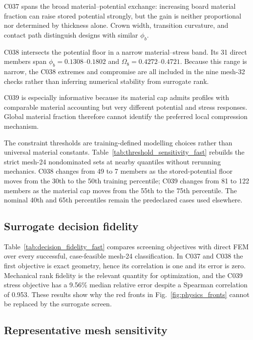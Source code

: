 \documentclass[11pt]{article}
\newcommand{\phib}{\phi_{b}}
\newcommand{\Om}{\Omega_{8}}
\begin{document}
C037 spans the broad material--potential exchange: increasing board material fraction can raise stored potential strongly, but the gain is neither proportional nor determined by thickness alone. Crown width, transition curvature, and contact path distinguish designs with similar $\phib$.

C038 intersects the potential floor in a narrow material--stress band. Its 31 direct members span $\phib=0.1308$--$0.1802$ and $\Om=0.4272$--$0.4721$. Because this range is narrow, the C038 extremes and compromise are all included in the nine mesh-32 checks rather than inferring numerical stability from surrogate rank.

C039 is especially informative because its material cap admits profiles with comparable material accounting but very different potential and stress responses. Global material fraction therefore cannot identify the preferred local compression mechanism.

The constraint thresholds are training-defined modelling choices rather than universal material constants. Table~\ref{tab:threshold_sensitivity_fast} rebuilds the strict mesh-24 nondominated sets at nearby quantiles without rerunning mechanics. C038 changes from 49 to 7 members as the stored-potential floor moves from the 30th to the 50th training percentile; C039 changes from 81 to 122 members as the material cap moves from the 55th to the 75th percentile. The nominal 40th and 65th percentiles remain the predeclared cases used elsewhere.



\subsection{Surrogate decision fidelity}

Table~\ref{tab:decision_fidelity_fast} compares screening objectives with direct FEM over every successful, case-feasible mesh-24 classification. In C037 and C038 the first objective is exact geometry, hence its correlation is one and its error is zero. Mechanical rank fidelity is the relevant quantity for optimization, and the C039 stress objective has a 9.56\% median relative error despite a Spearman correlation of 0.953. These results show why the red fronts in Fig.~\ref{fig:physics_fronts} cannot be replaced by the surrogate screen.



\subsection{Representative mesh sensitivity}
\end{document}
